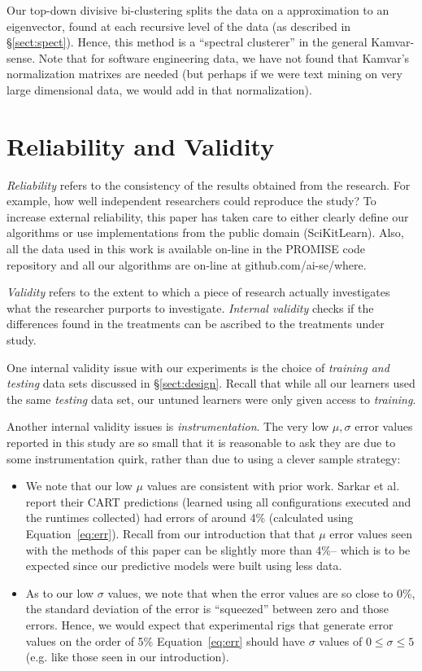 \documentclass{sig-alternative}
\newcommand{\bi}{\begin{itemize}}%
\newcommand{\ei}{\end{itemize}}
\newcommand{\tion}[1]{\S\ref{sect:#1}}
\newcommand{\eq}[1]{Equation~\ref{eq:#1}}
\begin{document}
Our
top-down divisive bi-clustering splits the data on a   approximation to an eigenvector, found at each recursive level
of the data (as described in \tion{spect}). 
Hence, this  method is a ``spectral clusterer'' in the general Kamvar-sense. 
Note that
for software engineering data, we have
not found that Kamvar's normalization matrixes are needed (but perhaps if we were text mining
on very large dimensional data, we would add in that normalization). 
 


\section{Reliability and Validity}\label{sect:construct}

{\em Reliability} refers to the consistency of the results obtained
from the research.  For example,   how well independent researchers
could reproduce the study? To increase external
reliability, this paper has taken care to either  clearly define our
algorithms or use implementations from the public domain
(SciKitLearn). Also, all the data used in this work is available
on-line in the PROMISE code repository and all our algorithms
are on-line at github.com/ai-se/where.

{\em Validity} refers to the extent to which a piece of research actually
investigates what the researcher purports to investigate.
{\em Internal validity} checks if the differences found in
the treatments can be ascribed to the treatments under study. 

One internal validity issue with our experiments is the choice
of {\em training and testing} data sets discussed in 
\tion{design}. Recall that while all our learners used the same
{\em testing} data set, our untuned learners were only given
access to {\em training}.

Another internal validity issues is {\em instrumentation}. The very low $\mu,\sigma$ error values
reported in this study are so small that it is reasonable to ask they are due to some instrumentation
quirk, rather than due to using a clever sample strategy:
\bi
\item
We note that our low $\mu$ values are consistent with prior work.  Sarkar et al.~\cite{sarkar2015cost} report their CART predictions
(learned using all configurations executed and the runtimes collected) had  errors of around 4\% (calculated using \eq{err}). Recall from our introduction that that  $\mu$ error values  seen with the methods of this paper
can be slightly more than 4\%-- which is to be expected since our predictive models were built using less
data. 
\item
As to our low $\sigma$ values, we note that when the  error values are so close to 0\%, the standard
deviation of the error is ``squeezed'' between zero and those errors. Hence, we would expect that
experimental rigs
that generate error values on the order of 5\% \eq{err} should have $\sigma$ values of $0\le \sigma \le 5$ (e.g. like those seen in our introduction).
\ei
\end{document}
